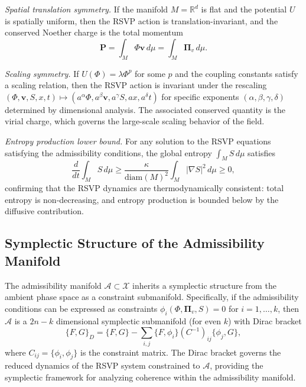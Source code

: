 \documentclass[11pt, oneside]{article}
\numberwithin{equation}{section}
\theoremstyle{rsvpstyle}
\theoremstyle{remark}
\newcommand{\vfield}{\mathbf{v}}
\newcommand{\Adm}{\mathcal{A}}
\newcommand{\Rspace}{\mathbb{R}}
\newcommand{\grad}{\nabla}
\begin{document}
\textit{Spatial translation symmetry.} If the manifold $M = \Rspace^d$ is flat and
the potential $U$ is spatially uniform, then the RSVP action is translation-invariant,
and the conserved Noether charge is the total momentum
\begin{equation}
  \mathbf{P} = \int_M \Phi \vfield \,d\mu = \int_M \boldsymbol{\Pi}_v \,d\mu.
\end{equation}

\textit{Scaling symmetry.} If $U(\Phi) = \lambda \Phi^p$ for some $p$ and the
coupling constants satisfy a scaling relation, then the RSVP action is invariant under
the rescaling $(\Phi, \vfield, S, x, t) \mapsto (a^\alpha \Phi, a^\beta \vfield,
a^\gamma S, a x, a^\delta t)$ for specific exponents $(\alpha, \beta, \gamma, \delta)$
determined by dimensional analysis. The associated conserved quantity is the
virial charge, which governs the large-scale scaling behavior of the field.

\textit{Entropy production lower bound.} For any solution to the RSVP equations
satisfying the admissibility conditions, the global entropy $\int_M S \,d\mu$ satisfies
\begin{equation}
  \frac{d}{dt} \int_M S \,d\mu \geq \frac{\kappa}{\text{diam}(M)^2}
  \int_M |\grad S|^2 \,d\mu \geq 0,
\end{equation}
confirming that the RSVP dynamics are thermodynamically consistent: total entropy is
non-decreasing, and entropy production is bounded below by the diffusive contribution.

\subsection{Symplectic Structure of the Admissibility Manifold}

The admissibility manifold $\Adm \subset \mathcal{X}$ inherits a symplectic structure
from the ambient phase space as a constraint submanifold. Specifically, if the
admissibility conditions can be expressed as constraints $\phi_i(\Phi, \boldsymbol{\Pi}_v, S) = 0$
for $i = 1, \ldots, k$, then $\Adm$ is a $2n - k$ dimensional symplectic submanifold
(for even $k$) with Dirac bracket
\begin{equation}
  \{F, G\}_D = \{F, G\} - \sum_{i,j} \{F, \phi_i\} (C^{-1})_{ij} \{\phi_j, G\},
\end{equation}
where $C_{ij} = \{\phi_i, \phi_j\}$ is the constraint matrix. The Dirac bracket
governs the reduced dynamics of the RSVP system constrained to $\Adm$, providing
the symplectic framework for analyzing coherence within the admissibility manifold.
\end{document}
